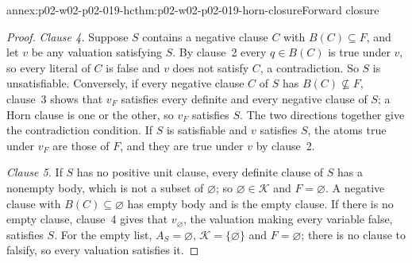 \begin{annexitem}{annex:p02-w02-p02-019-hc}{thm:p02-w02-p02-019-horn-closure}{Forward closure}
\begin{proof}
\emph{Clause 4.}  Suppose \(S\) contains a negative clause \(C\) with
\(B(C)\subseteq F\), and let \(v\) be any valuation satisfying \(S\).  By
clause~2 every \(q\in B(C)\) is true under \(v\), so every literal of \(C\) is
false and \(v\) does not satisfy \(C\), a contradiction.  So \(S\) is
unsatisfiable.  Conversely, if every negative clause \(C\) of \(S\) has
\(B(C)\not\subseteq F\), clause~3 shows that \(v_F\) satisfies every definite
and every negative clause of \(S\); a Horn clause is one or the other, so
\(v_F\) satisfies \(S\).  The two directions together give the contradiction
condition.  If \(S\) is satisfiable and \(v\) satisfies \(S\), the atoms true
under \(v_F\) are those of \(F\), and they are true under \(v\) by clause~2.

\emph{Clause 5.}  If \(S\) has no positive unit clause, every definite clause
of \(S\) has a nonempty body, which is not a subset of \(\varnothing\); so
\(\varnothing\in\mathcal K\) and \(F=\varnothing\).  A negative clause with
\(B(C)\subseteq\varnothing\) has empty body and is the empty clause.  If there
is no empty clause, clause~4 gives that \(v_\varnothing\), the valuation
making every variable false, satisfies \(S\).  For the empty list,
\(A_S=\varnothing\), \(\mathcal K=\{\varnothing\}\) and \(F=\varnothing\);
there is no clause to falsify, so every valuation satisfies it.
\end{proof}
\end{annexitem}

